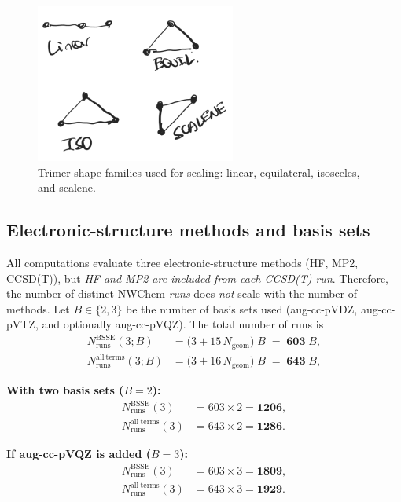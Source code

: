 \begin{figure}[!ht]
  \centering
  \includegraphics[width=0.28\linewidth]{images/trimers.png}
  \caption{Trimer shape families used for scaling: linear, equilateral, isosceles, and scalene.}
  \label{fig:figure-1}
\end{figure}

\subsection*{\centering Electronic-structure methods and basis sets}

All computations evaluate three electronic-structure methods
(HF, MP2, CCSD(T)), but \emph{HF and MP2 are included from each CCSD(T) run}.
Therefore, the number of distinct NWChem \emph{runs} does \emph{not} scale with the number of methods.
Let $B\in\{2,3\}$ be the number of basis sets used (aug-cc-pVDZ, aug-cc-pVTZ, and optionally aug-cc-pVQZ).
The total number of runs is
\begin{equation*}
\boxed{
\begin{aligned}
N_{\mathrm{runs}}^{\mathrm{BSSE}}(3; B)
  &= \bigl(3 + 15\,N_{\mathrm{geom}}\bigr)\; B
   \;=\; \mathbf{603}\; B,\\[4pt]
N_{\mathrm{runs}}^{\mathrm{all\ terms}}(3; B)
  &= \bigl(3 + 16\,N_{\mathrm{geom}}\bigr)\; B
   \;=\; \mathbf{643}\; B,
\end{aligned}}
\end{equation*}

\noindent\textbf{With two basis sets ($B=2$):}
\begin{equation*}
\boxed{
\begin{aligned}
N_{\mathrm{runs}}^{\mathrm{BSSE}}(3)
  &= 603 \times 2 = \mathbf{1206},\\[2pt]
N_{\mathrm{runs}}^{\mathrm{all\ terms}}(3)
  &= 643 \times 2 = \mathbf{1286}.
\end{aligned}}
\end{equation*}

\noindent\textbf{If aug-cc-pVQZ is added ($B=3$):}
\begin{equation*}
\boxed{
\begin{aligned}
N_{\mathrm{runs}}^{\mathrm{BSSE}}(3)
  &= 603 \times 3 = \mathbf{1809},\\[2pt]
N_{\mathrm{runs}}^{\mathrm{all\ terms}}(3)
  &= 643 \times 3 = \mathbf{1929}.
\end{aligned}}
\end{equation*}

